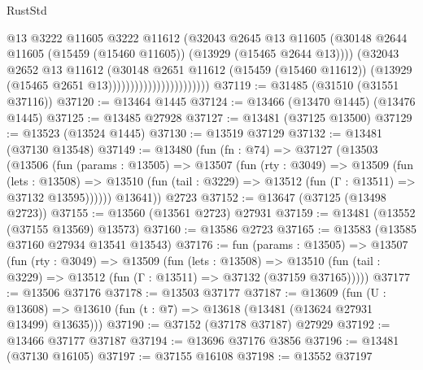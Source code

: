\begin{lexlean}{RustStd}
\begin{coremodule}
                                          @13
                                          @3222
                                          @11605
                                          @3222
                                          @11612
                                          (@32043
                                            @2645
                                            @13
                                            @11605
                                            (@30148
                                              @2644
                                              @11605
                                              (@15459 (@15460 @11605))
                                              (@13929 (@15465 @2644 @13))))
                                          (@32043
                                            @2652
                                            @13
                                            @11612
                                            (@30148
                                              @2651
                                              @11612
                                              (@15459 (@15460 @11612))
                                              (@13929 (@15465 @2651 @13)))))))))))))))))))))))
@37119 := @31485 (@31510 (@31551 @37116))
@37120 := @13464 @1445
@37124 := @13466 (@13470 @1445) (@13476 @1445)
@37125 := @13485 @27928
@37127 := @13481 (@37125 @13500)
@37129 := @13523 (@13524 @1445)
@37130 := @13519 @37129
@37132 := @13481 (@37130 @13548)
@37149 := @13480
    (fun (fn : @74) =>
    @37127
      (@13503
        (@13506
          (fun (params : @13505) =>
          @13507
            (fun (rty : @3049) =>
            @13509
              (fun (lets : @13508) =>
              @13510 (fun (tail : @3229) => @13512 (fun (Γ : @13511) => @37132 @13595))))))
        @13641))
    @2723
@37152 := @13647 (@37125 (@13498 @2723))
@37155 := @13560 (@13561 @2723) @27931
@37159 := @13481 (@13552 (@37155 @13569) @13573)
@37160 := @13586 @2723
@37165 := @13583 (@13585 @37160 @27934 @13541 @13543)
@37176 := fun (params : @13505) =>
  @13507
    (fun (rty : @3049) =>
    @13509
      (fun (lets : @13508) =>
      @13510 (fun (tail : @3229) => @13512 (fun (Γ : @13511) => @37132 (@37159 @37165)))))
@37177 := @13506 @37176
@37178 := @13503 @37177
@37187 := @13609
    (fun (U : @13608) => @13610 (fun (t : @7) => @13618 (@13481 (@13624 @27931 @13499) @13635)))
@37190 := @37152 (@37178 @37187) @27929
@37192 := @13466 @37177 @37187
@37194 := @13696 @37176 @3856
@37196 := @13481 (@37130 @16105)
@37197 := @37155 @16108
@37198 := @13552 @37197

\end{coremodule}
\end{lexlean}
